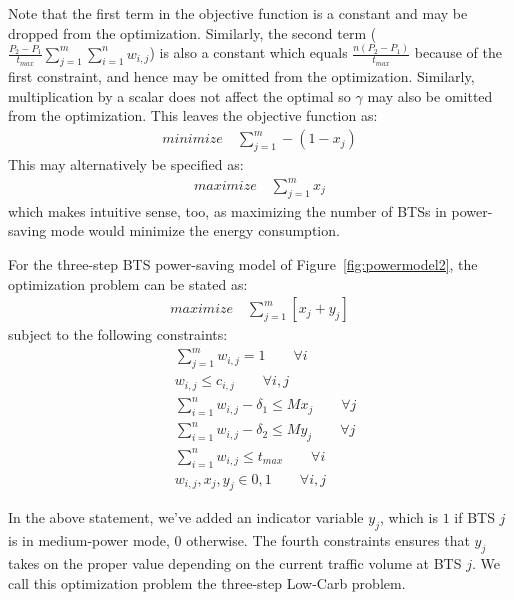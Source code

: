 Note that the first term in the objective function is a constant and may be dropped from the optimization. Similarly, the second term ($\frac{P_2-P_1}{t_{max}}\sum\limits_{j=1}^{m}\sum\limits_{i=1}^{n}w_{i,j}$) is also a constant which equals $\frac{n(P_2-P_1)}{t_{max}}$ because of the first constraint, and hence may be omitted from the optimization. Similarly, multiplication by a scalar does not affect the optimal so $\gamma$ may also be omitted from the optimization. This leaves the objective function as:
\begin{align}
\textit{minimize} \quad \sum_{j=1}^{m} -(1-x_j)
\end{align}
This may alternatively be specified as:
\begin{align}
\textit{maximize} \quad \sum_{j=1}^{m} x_j
\end{align}
which makes intuitive sense, too, as maximizing the number of BTSs in power-saving mode would minimize the energy consumption.


For the three-step BTS power-saving model of Figure~\ref{fig:powermodel2}, the optimization problem can be stated as:
\begin{align}
\textit{maximize} \quad \sum_{j=1}^{m} \left[
x_j+y_j
\right]
\end{align}
subject to the following constraints:
\begin{align}
& \sum_{j=1}^m w_{i,j} = 1 \qquad \forall i \\
& w_{i,j} \leq c_{i,j} \qquad \forall i, j \\
& \sum_{i=1}^nw_{i,j}-\delta_1 \leq Mx_j \qquad \forall j\\
& \sum_{i=1}^nw_{i,j}-\delta_2 \leq My_j \qquad \forall j\\
& \sum_{i=1}^n w_{i,j} \le t_{max} \qquad \forall i \\
& w_{i,j}, x_j, y_j\in {0,1} \qquad \forall i, j%
\end{align}

In the above statement, we've added an indicator variable $y_j$, which is $1$ if BTS $j$ is in medium-power mode, $0$ otherwise. The fourth constraints ensures that $y_j$ takes on the proper value depending on the current traffic volume at BTS $j$. We call this optimization problem the three-step Low-Carb problem.

